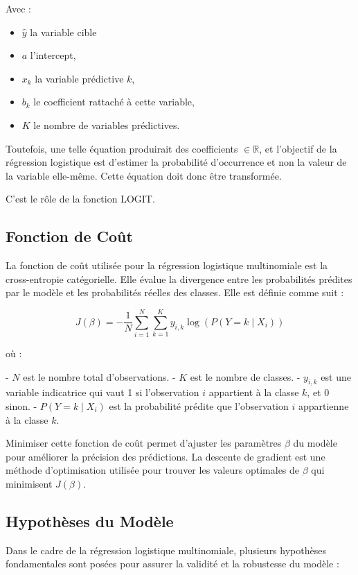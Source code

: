 \documentclass[10pt,french]{report}
\begin{document}
     Avec :
     \begin{itemize}
         \item $\hat{y}$ la variable cible
         \item $a$ l'intercept,
         \item $x_k$ la variable prédictive $k$,
         \item $b_k$ le coefficient rattaché à cette variable,
         \item $K$ le nombre de variables prédictives.
     \end{itemize}

    Toutefois, une telle équation produirait des coefficients $\in \mathbb{R}$, et l'objectif de la régression logistique est d'estimer la probabilité d'occurrence et non la valeur de la variable elle-même. Cette équation doit donc être transformée.

    C'est le rôle de la fonction LOGIT.

	\subsection{Fonction de Coût}
	La fonction de coût utilisée pour la régression logistique multinomiale est la cross-entropie catégorielle. Elle évalue la divergence entre les probabilités prédites par le modèle et les probabilités réelles des classes. Elle est définie comme suit :

	\[
	J(\beta) = -\frac{1}{N} \sum_{i=1}^{N} \sum_{k=1}^{K} y_{i,k} \log\left( P(Y = k \mid X_i) \right)
	\]

	où :

	- \( N \) est le nombre total d'observations.
	- \( K \) est le nombre de classes.
	- \( y_{i,k} \) est une variable indicatrice qui vaut 1 si l'observation \( i \) appartient à la classe \( k \), et 0 sinon.
	- \( P(Y = k \mid X_i) \) est la probabilité prédite que l'observation \( i \) appartienne à la classe \( k \).

	Minimiser cette fonction de coût permet d'ajuster les paramètres \( \beta \) du modèle pour améliorer la précision des prédictions. La descente de gradient est une méthode d'optimisation utilisée pour trouver les valeurs optimales de \( \beta \) qui minimisent \( J(\beta) \).

	\subsection{Hypothèses du Modèle}
	Dans le cadre de la régression logistique multinomiale, plusieurs hypothèses fondamentales sont posées pour assurer la validité et la robustesse du modèle :
\end{document}
